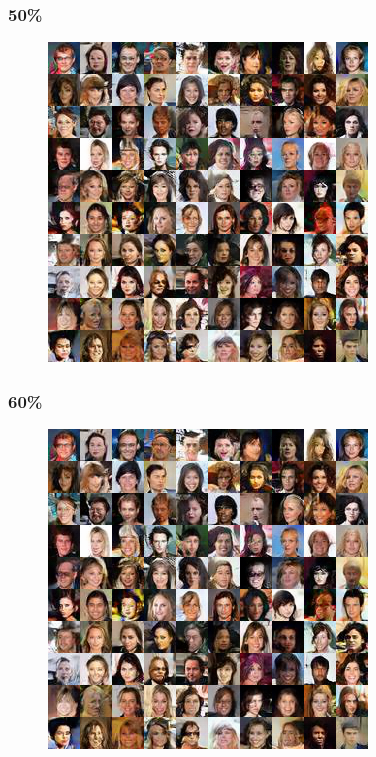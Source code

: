\documentclass[dvipdfmx,12pt]{beamer}
\begin{document}
\begin{frame}
	\frametitle{50\%}
	\begin{figure}[htbp]
	\begin{center}
	\includegraphics[width=0.7\hsize]{./sndcgan/image00050000.png}
	\end{center}
	\end{figure}
\end{frame}
\begin{frame}
	\frametitle{60\%}
	\begin{figure}[htbp]
	\begin{center}
	\includegraphics[width=0.7\hsize]{./sndcgan/image00060000.png}
	\end{center}
	\end{figure}
\end{frame}
\end{document}
